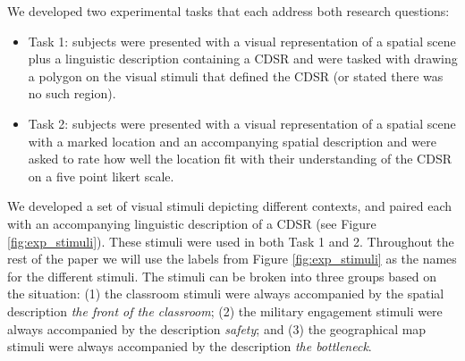 \documentclass[11pt,letterpaper]{article}
\begin{document}

We developed two experimental tasks that each address both research questions:
\begin{itemize}
	\item{Task 1:} subjects were presented with a visual representation of a spatial scene plus a linguistic description containing a CDSR and were tasked with drawing a polygon on the visual stimuli that defined the CDSR (or stated there was no such region).
	\item{Task 2:} subjects were presented with a visual representation of a spatial scene with a marked location and an accompanying spatial description and were asked to rate how well the location fit with their understanding of the CDSR on a five point likert scale.
\end{itemize}

We developed a set of visual stimuli depicting different contexts, and paired each with an accompanying linguistic description of a CDSR (see Figure \ref{fig:exp_stimuli}). These stimuli were used in both Task 1 and 2. Throughout the rest of the paper we will use the labels from Figure \ref{fig:exp_stimuli} as the names for the different stimuli. The stimuli can be broken into three groups based on the situation: (1) the classroom stimuli were always accompanied by the spatial description \emph{the front of the classroom}; (2) the military engagement stimuli were always accompanied by the description \emph{safety}; and (3) the geographical map stimuli were always accompanied by the description \emph{the bottleneck}.
\end{document}
